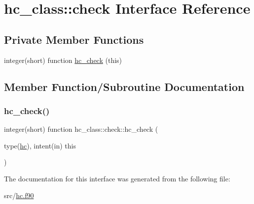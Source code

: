 \hypertarget{interfacehc__class_1_1check}{}\section{hc\+\_\+class\+:\+:check Interface Reference}
\label{interfacehc__class_1_1check}
\subsection*{Private Member Functions}
\begin{DoxyCompactItemize}
\item 
integer(short) function \hyperlink{interfacehc__class_1_1check_a6b3cd4e85957d3b216af265404780025}{hc\+\_\+check} (this)
\end{DoxyCompactItemize}


\subsection{Member Function/\+Subroutine Documentation}
\mbox{\label{interfacehc__class_1_1check_a6b3cd4e85957d3b216af265404780025}} 
\subsubsection{\texorpdfstring{hc\+\_\+check()}{hc\_check()}}
{\footnotesize\ttfamily integer(short) function hc\+\_\+class\+::check\+::hc\+\_\+check (\begin{DoxyParamCaption}\item[{type(\hyperlink{structhc__class_1_1hc}{hc}), intent(in)}]{this }\end{DoxyParamCaption})\hspace{0.3cm}{\ttfamily [private]}}



The documentation for this interface was generated from the following file\+:\begin{DoxyCompactItemize}
\item 
src/\hyperlink{hc_8f90}{hc.\+f90}\end{DoxyCompactItemize}
